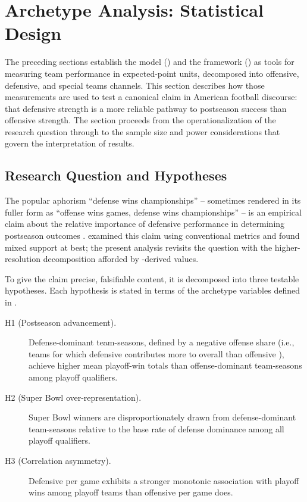 \section{Archetype Analysis: Statistical Design}
\label{sec:archetype-analysis}

The preceding sections establish the \xscore{} model () and
the \gds{} framework () as tools for measuring team performance
in expected-point units, decomposed into offensive, defensive, and
special teams channels. This section describes how those measurements are used
to test a canonical claim in American football discourse: that defensive
strength is a more reliable pathway to postseason success than offensive
strength. The section proceeds from the operationalization of the research
question through to the sample size and power considerations that govern the
interpretation of results.

\subsection{Research Question and Hypotheses}
\label{sec:hypotheses}

The popular aphorism ``defense wins championships'' -- sometimes rendered in
its fuller form as ``offense wins games, defense wins championships'' -- is
an empirical claim about the relative importance of defensive performance
in determining postseason outcomes \parencite{robst2011defense}.
\textcite{robst2011defense} examined this claim using conventional metrics
and found mixed support at best; the present analysis revisits the question
with the higher-resolution decomposition afforded by \gds{}-derived \xvoa{}
values.

To give the claim precise, falsifiable content, it is decomposed into three
testable hypotheses. Each hypothesis is stated in terms of the archetype
variables defined in .

\begin{description}
  \item[H1 (Postseason advancement).] Defense-dominant team-seasons, defined
        by a negative offense share (i.e., teams for which defensive
        \xvoa{} contributes more to overall \gds{} than offensive \xvoa{}),
        achieve higher mean playoff-win totals than offense-dominant
        team-seasons among playoff qualifiers.

  \item[H2 (Super Bowl over-representation).] Super Bowl winners are
        disproportionately drawn from defense-dominant team-seasons relative to
        the base rate of defense dominance among all playoff qualifiers.

  \item[H3 (Correlation asymmetry).] Defensive \xvoa{} per game exhibits a
        stronger monotonic association with playoff wins among playoff teams than
        offensive \xvoa{} per game does.
\end{description}

